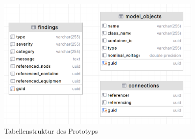 \begin{figure}[t!]
    \centering
    \includegraphics[width=0.9\textwidth]{content/img/Empire/Backend/tabellenstruktur.png}
    \caption{Tabellenstruktur des Prototyps}
    \label{fig:Tabellenstruktur}
\end{figure}
\FloatBarrier

\hspace{5em}
